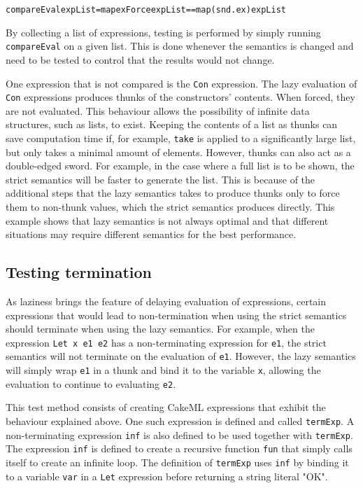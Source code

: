 \begin{alltt}
  compareEval expList = map exForce expList == map (snd . ex) expList
\end{alltt}

By collecting a list of expressions, testing is performed by simply running
\texttt{compareEval} on a given list. This is done whenever the semantics is
changed and need to be tested to control that the results would not change.

One expression that is not compared is the \texttt{Con} expression. The lazy
evaluation of \texttt{Con} expressions produces thunks of the constructors'
contents. When forced, they are not evaluated. This behaviour allows the
possibility of infinite data structures, such as lists, to exist.
Keeping the contents of a list as thunks can save computation time if,
for example, \texttt{take} is applied to a significantly large list, but only
takes a minimal amount of elements. However, thunks can also
act as a double-edged sword. For example, in the case where a full list is to be
shown, the strict semantics will be faster to generate the list. This is because
of the additional steps that the lazy semantics takes to produce thunks only to
force them to non-thunk values, which the strict semantics produces directly.
This example shows that lazy semantics is not always optimal and that different
situations may require different semantics for the best performance.

\subsection{Testing termination}
As laziness brings the feature of delaying evaluation of expressions, certain
expressions that would lead to non-termination when using the strict semantics
should terminate when using the lazy semantics. For example, when the expression
\texttt{Let x e1 e2} has a non-terminating expression for \texttt{e1}, the
strict semantics will not terminate on the evaluation of \texttt{e1}. However,
the lazy semantics will simply wrap \texttt{e1} in a thunk and bind it to the
variable \texttt{x}, allowing the evaluation to continue to evaluating
\texttt{e2}.

This test method consists of creating CakeML expressions that exhibit the
behaviour explained above. One such expression is defined
and called \texttt{termExp}. A non-terminating expression \texttt{inf} is also
defined to be used together with \texttt{termExp}.
The expression
\texttt{inf} is defined to create a recursive function \texttt{fun}
that simply calls itself to create an infinite loop.
The definition of \texttt{termExp} uses
\texttt{inf} by binding it to a variable \texttt{var} in a \texttt{Let}
expression before returning a string literal "OK".

